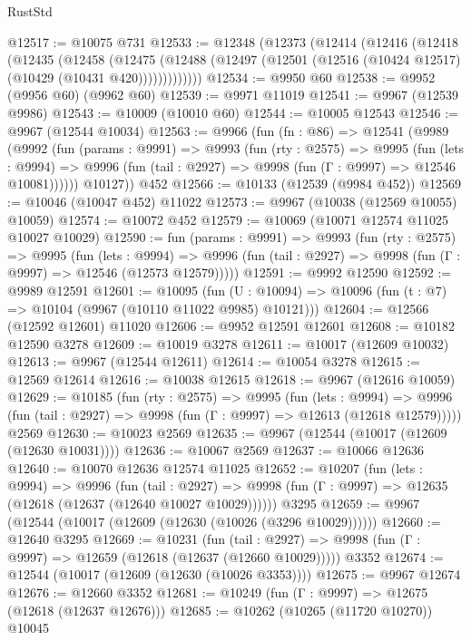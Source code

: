 \begin{lexlean}{RustStd}
\begin{coremodule}
@12517 := @10075 @731
@12533 := @12348
    (@12373
      (@12414
        (@12416
          (@12418
            (@12435
              (@12458
                (@12475
                  (@12488 (@12497 (@12501 (@12516 (@10424 @12517) (@10429 (@10431 @420)))))))))))))
@12534 := @9950 @60
@12538 := @9952 (@9956 @60) (@9962 @60)
@12539 := @9971 @11019
@12541 := @9967 (@12539 @9986)
@12543 := @10009 (@10010 @60)
@12544 := @10005 @12543
@12546 := @9967 (@12544 @10034)
@12563 := @9966
    (fun (fn : @86) =>
    @12541
      (@9989
        (@9992
          (fun (params : @9991) =>
          @9993
            (fun (rty : @2575) =>
            @9995
              (fun (lets : @9994) =>
              @9996 (fun (tail : @2927) => @9998 (fun (Γ : @9997) => @12546 @10081))))))
        @10127))
    @452
@12566 := @10133 (@12539 (@9984 @452))
@12569 := @10046 (@10047 @452) @11022
@12573 := @9967 (@10038 (@12569 @10055) @10059)
@12574 := @10072 @452
@12579 := @10069 (@10071 @12574 @11025 @10027 @10029)
@12590 := fun (params : @9991) =>
  @9993
    (fun (rty : @2575) =>
    @9995
      (fun (lets : @9994) =>
      @9996 (fun (tail : @2927) => @9998 (fun (Γ : @9997) => @12546 (@12573 @12579)))))
@12591 := @9992 @12590
@12592 := @9989 @12591
@12601 := @10095
    (fun (U : @10094) => @10096 (fun (t : @7) => @10104 (@9967 (@10110 @11022 @9985) @10121)))
@12604 := @12566 (@12592 @12601) @11020
@12606 := @9952 @12591 @12601
@12608 := @10182 @12590 @3278
@12609 := @10019 @3278
@12611 := @10017 (@12609 @10032)
@12613 := @9967 (@12544 @12611)
@12614 := @10054 @3278
@12615 := @12569 @12614
@12616 := @10038 @12615
@12618 := @9967 (@12616 @10059)
@12629 := @10185
    (fun (rty : @2575) =>
    @9995
      (fun (lets : @9994) =>
      @9996 (fun (tail : @2927) => @9998 (fun (Γ : @9997) => @12613 (@12618 @12579)))))
    @2569
@12630 := @10023 @2569
@12635 := @9967 (@12544 (@10017 (@12609 (@12630 @10031))))
@12636 := @10067 @2569
@12637 := @10066 @12636
@12640 := @10070 @12636 @12574 @11025
@12652 := @10207
    (fun (lets : @9994) =>
    @9996
      (fun (tail : @2927) =>
      @9998 (fun (Γ : @9997) => @12635 (@12618 (@12637 (@12640 @10027 @10029))))))
    @3295
@12659 := @9967 (@12544 (@10017 (@12609 (@12630 (@10026 (@3296 @10029))))))
@12660 := @12640 @3295
@12669 := @10231
    (fun (tail : @2927) => @9998 (fun (Γ : @9997) => @12659 (@12618 (@12637 (@12660 @10029)))))
    @3352
@12674 := @12544 (@10017 (@12609 (@12630 (@10026 @3353))))
@12675 := @9967 @12674
@12676 := @12660 @3352
@12681 := @10249 (fun (Γ : @9997) => @12675 (@12618 (@12637 @12676)))
@12685 := @10262 (@10265 (@11720 @10270)) @10045

\end{coremodule}
\end{lexlean}
